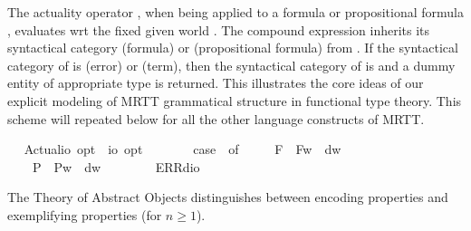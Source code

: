 \begin{isabellebody}
\begin{isamarkuptext}
The actuality operator \isa{\isactrlbold {\isasymA}}, when being applied to a formula or propositional formula 
  \isa{{\isasymphi}}, evaluates \isa{{\isasymphi}} wrt the fixed given world . 
  The compound expression \isa{\isactrlbold {\isasymA}{\isasymphi}} inherits its syntactical category   (formula) or
   (propositional formula) from \isa{{\isasymphi}}. If the syntactical category of  \isa{{\isasymphi}} is 
   (error) or  (term), then the syntactical category of \isa{\isactrlbold {\isasymA}{\isasymphi}} 
  is  and a dummy entity of appropriate type is returned. This illustrates the core 
  ideas of our explicit modeling of MRTT grammatical structure in functional type theory. 
  This scheme will repeated below for all the other language constructs of MRTT.%
\end{isamarkuptext}\isamarkuptrue%
\ \isamarkupfalse%
\ Actual{\isacharcolon}{\isacharcolon}{\isachardoublequoteopen}io\ opt\ {\isasymRightarrow}\ io\ opt{\isachardoublequoteclose}\ {\isacharparenleft}{\isachardoublequoteopen}\isactrlbold {\isasymA}\ {\isacharunderscore}{\isachardoublequoteclose}\ {\isacharbrackleft}{}{}{\isacharbrackright}\ {}{}{\isacharparenright}\ \ {\isachardoublequoteopen}\isactrlbold {\isasymA}{\isasymphi}\ {\isasymequiv}\ case\ {\isasymphi}\ of\ \isanewline
\ \ \ \ F{\isacharparenleft}{\isasympsi}{\isacharparenright}\ {\isasymRightarrow}\ F{\isacharparenleft}{\isasymlambda}w{\isachardot}\ {\isasympsi}\ dw{\isacharparenright}\ {\isacharbar}\ \isanewline
\ \ \ \ P{\isacharparenleft}{\isasympsi}{\isacharparenright}\ {\isasymRightarrow}\ P{\isacharparenleft}{\isasymlambda}w{\isachardot}\ {\isasympsi}\ dw{\isacharparenright}\ {\isacharbar}\ \isanewline
\ \ \ \ {\isacharunderscore}\ {\isasymRightarrow}\ ERR{\isacharparenleft}dio{\isacharparenright}{\isachardoublequoteclose}%
\begin{isamarkuptext}%
The Theory of Abstract Objects distinguishes between encoding properties  and 
  exemplifying properties  (for $n\geq 1$). 


\end{isamarkuptext}
\end{isabellebody}
